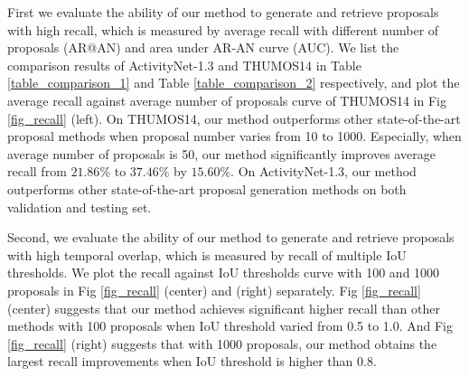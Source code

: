 \documentclass[runningheads]{llncs}
\begin{document}
First we evaluate the ability of our method to generate and retrieve proposals with high recall, which is measured by average recall with different number  of proposals (AR@AN) and area under AR-AN curve (AUC). We list the comparison results of ActivityNet-1.3 and THUMOS14 in Table \ref{table_comparison_1} and Table \ref{table_comparison_2} respectively, and plot the average recall against average number of proposals curve of THUMOS14 in Fig \ref{fig_recall} (left).
On THUMOS14, our method outperforms other state-of-the-art proposal methods when proposal number varies from 10 to 1000. Especially, when average number of proposals is 50, our method significantly improves average recall from $21.86\%$ to $37.46\%$ by $15.60\%$. On ActivityNet-1.3, our method outperforms other state-of-the-art proposal generation methods on both validation and testing set. %


Second, we evaluate the ability of our method to generate and retrieve proposals with high temporal overlap, which is measured by recall of multiple IoU thresholds. 
We plot the recall against IoU thresholds curve with 100 and 1000 proposals in Fig \ref{fig_recall} (center) and (right) separately.
Fig \ref{fig_recall} (center) suggests that our method achieves significant higher recall than other methods with 100 proposals when IoU threshold varied from 0.5 to 1.0. 
 And Fig \ref{fig_recall} (right) suggests that with 1000 proposals, our method obtains the largest recall improvements when IoU threshold is higher than 0.8. 
\end{document}

